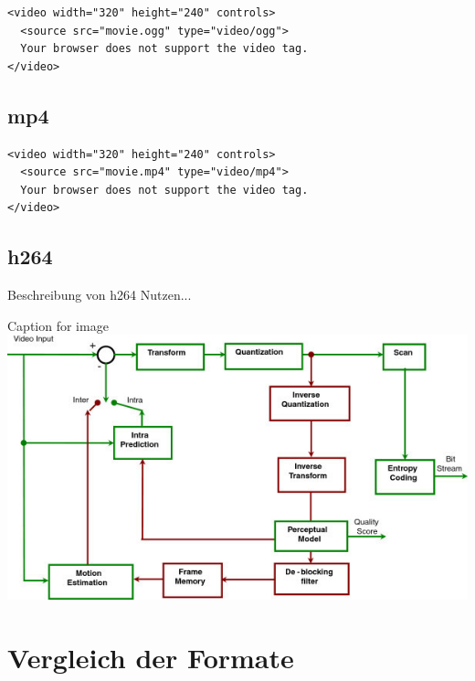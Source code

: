\begin{verbatim}
<video width="320" height="240" controls>
  <source src="movie.ogg" type="video/ogg">
  Your browser does not support the video tag.
</video> 
\end{verbatim}

\subsection{mp4}

\begin{verbatim}
<video width="320" height="240" controls>
  <source src="movie.mp4" type="video/mp4">
  Your browser does not support the video tag.
</video> 
\end{verbatim}

\subsection{h264}

Beschreibung von h264 Nutzen...

\begin{minipage}{\textwidth}
    \begin{center}
        Caption for image
        \includegraphics[scale=4.0]{img/h264.jpg} 
    \end{center}
\end{minipage}

\section{Vergleich der Formate}

